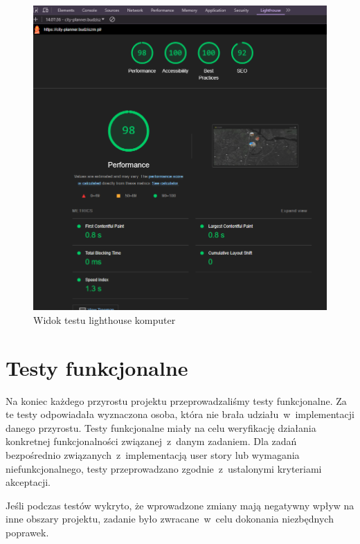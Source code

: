     \begin{figure}[H]
        \centering
        \includegraphics[width=1\textwidth]{attachments/lighthouse}
        \caption{Widok testu lighthouse komputer}
        \label{fig:testy-lighthouse-desktop}
        \end{figure}
\section{Testy funkcjonalne}
\label{sec:testy-funkcjonalne}

Na koniec każdego przyrostu projektu przeprowadzaliśmy testy funkcjonalne. Za te testy odpowiadała wyznaczona osoba, która nie brała udziału~w~implementacji danego przyrostu. 
Testy funkcjonalne miały na celu weryfikację działania konkretnej funkcjonalności związanej~z~danym zadaniem. \newline
Dla zadań bezpośrednio związanych~z~implementacją user story lub wymagania niefunkcjonalnego, testy przeprowadzano zgodnie~z~ustalonymi kryteriami akceptacji. \newline

Jeśli podczas testów wykryto, że wprowadzone zmiany mają negatywny wpływ na inne obszary projektu, zadanie było zwracane~w~celu dokonania niezbędnych poprawek.\newline

